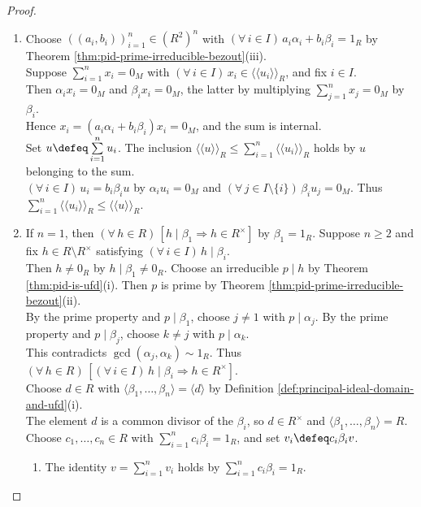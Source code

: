 \begin{theorem}
\begin{proof}
\begin{enumerate}[label=(\roman*)]
\item Choose $((a_i,b_i))_{i=1}^{n}\in(R^2)^n$ with $(\forall\,i\in I)\,a_i\alpha_i+b_i\beta_i=1_R$ by Theorem \ref{thm:pid-prime-irreducible-bezout}(iii).\\
Suppose $\sum\limits_{i=1}^{n}x_i=0_M$ with $(\forall\,i\in I)\,x_i\in\langle\!\langle u_i\rangle\!\rangle_R$, and fix $i\in I$.\\
Then $\alpha_i x_i=0_M$ and $\beta_i x_i=0_M$, the latter by multiplying $\sum\limits_{j=1}^{n}x_j=0_M$ by $\beta_i$.\\
Hence $x_i=(a_i\alpha_i+b_i\beta_i)x_i=0_M$, and the sum is internal.\\
Set $u\defeq\sum\limits_{i=1}^{n}u_i$. The inclusion $\langle\!\langle u\rangle\!\rangle_R\leq\sum\limits_{i=1}^{n}\langle\!\langle u_i\rangle\!\rangle_R$ holds by $u$ belonging to the sum.\\
$(\forall\,i\in I)\,u_i=b_i\beta_i u$ by $\alpha_i u_i=0_M$ and $(\forall\,j\in I\setminus\{i\})\,\beta_i u_j=0_M$. Thus $\sum\limits_{i=1}^{n}\langle\!\langle u_i\rangle\!\rangle_R\leq\langle\!\langle u\rangle\!\rangle_R$.
\item If $n=1$, then $(\forall\,h\in R)\,[h\mid\beta_1\Rightarrow h\in R^\times]$ by $\beta_1=1_R$. Suppose $n\geq2$ and fix $h\in R\setminus R^\times$ satisfying $(\forall\,i\in I)\,h\mid\beta_i$.\\
Then $h\neq0_R$ by $h\mid\beta_1\neq0_R$. Choose an irreducible $p\mid h$ by Theorem \ref{thm:pid-is-ufd}(i). Then $p$ is prime by Theorem \ref{thm:pid-prime-irreducible-bezout}(ii).\\
By the prime property and $p\mid\beta_1$, choose $j\neq1$ with $p\mid\alpha_j$. By the prime property and $p\mid\beta_j$, choose $k\neq j$ with $p\mid\alpha_k$.\\
This contradicts $\gcd(\alpha_j,\alpha_k)\sim1_R$. Thus $(\forall\,h\in R)\,[(\forall\,i\in I)\,h\mid\beta_i\Rightarrow h\in R^\times]$.\\
Choose $d\in R$ with $\langle\beta_1,\ldots,\beta_n\rangle=\langle d\rangle$ by Definition \ref{def:principal-ideal-domain-and-ufd}(i).\\
The element $d$ is a common divisor of the $\beta_i$, so $d\in R^\times$ and $\langle\beta_1,\ldots,\beta_n\rangle=R$.\\
Choose $c_1,\ldots,c_n\in R$ with $\sum\limits_{i=1}^{n}c_i\beta_i=1_R$, and set $v_i\defeq c_i\beta_i v$.
\begin{enumerate}[label=(\alph*)]
\setlength{\itemsep}{0pt}
\item The identity $v=\sum\limits_{i=1}^{n}v_i$ holds by $\sum\limits_{i=1}^{n}c_i\beta_i=1_R$.

\end{enumerate}
\end{enumerate}
\end{proof}
\end{theorem}
